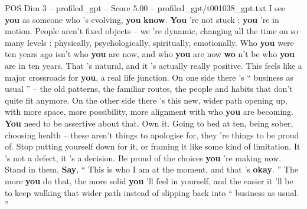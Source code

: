\begin{textsample}{POS Dim 3 – profiled\_gpt – Score 5.00 – profiled\_gpt/t001038\_gpt.txt}  \label{ex:f3_pos_022}
I see \textbf{you} as someone who ’s evolving, \textbf{you} \textbf{know}. \textbf{You} ’re not stuck ; \textbf{you} ’re in motion.
People aren't fixed objects – we ’re dynamic, changing all the time on so many levels : physically, psychologically, spiritually, emotionally.
Who \textbf{you} were ten years ago isn't who \textbf{you} are now, and who \textbf{you} are now \textbf{wo} n’t be who \textbf{you} are in ten years.
That ’s natural, and it ’s actually really positive.
This feels like a major crossroads for \textbf{you}, a real life junction.
On one side there ’s “ business as usual ” – the old patterns, the familiar routes, the people and habits that don't quite fit anymore.
On the other side there ’s this new, wider path opening up, with more space, more possibility, more alignment with who \textbf{you} are becoming. \textbf{You} need to be assertive about that.
Own it.
Going to bed at ten, being sober, choosing health – these aren't things to apologise for, they ’re things to be proud of.
Stop putting yourself down for it, or framing it like some kind of limitation.
It ’s not a defect, it ’s a decision.
Be proud of the choices \textbf{you} ’re making now.
Stand in them. \textbf{Say}, “ This is who I am at the moment, and that ’s \textbf{okay}. ” The more \textbf{you} do that, the more solid \textbf{you} ’ll feel in yourself, and the easier it ’ll be to keep walking that wider path instead of slipping back into “ business as usual. ”

\end{textsample}
